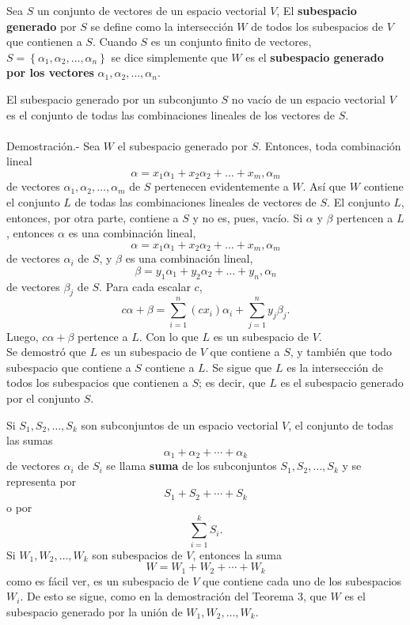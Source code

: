 \begin{def.}
    Sea $S$ un conjunto de vectores de un espacio vectorial $V$, El \textbf{subespacio generado} por $S$ se define como la intersección $W$ de todos los subespacios de $V$ que contienen a $S$. Cuando $S$ es un conjunto finito de vectores, $S=\left\{\alpha_1,\alpha_2,\ldots,\alpha_n\right\}$ se dice simplemente que $W$ es el \textbf{subespacio generado por los vectores} $\alpha_1,\alpha_2,\ldots,\alpha_n$.
\end{def.}

\begin{teo}
    El subespacio generado por un subconjunto $S$ no vacío de un espacio vectorial $V$ es el conjunto de todas las combinaciones lineales de los vectores de $S$.\\\\
	Demostración.-\; Sea $W$ el subespacio generado por $S$. Entonces, toda combinación lineal 
	$$\alpha=x_1\alpha_1+x_2\alpha_2+\ldots+x_m,\alpha_m$$
	de vectores $\alpha_1,\alpha_2,\ldots,\alpha_m$ de $S$ pertenecen evidentemente a $W$. Así que $W$ contiene el conjunto $L$ de todas las combinaciones lineales de vectores de $S$. El conjunto $L$, entonces, por otra parte, contiene a $S$ y no es, pues, vacío. Si $\alpha$ y $\beta$ pertencen a $L$, entonces $\alpha$ es una combinación lineal,
	$$\alpha=x_1\alpha_1+x_2\alpha_2+\ldots+x_m,\alpha_m$$
	de vectores $\alpha_i$ de $S$, y $\beta$ es una combinación lineal,
	$$\beta=y_1\alpha_1+y_2\alpha_2+\ldots+y_n,\alpha_n$$
	de vectores $\beta_j$ de $S$. Para cada escalar $c$,
	$$c\alpha+\beta=\sum_{i=1}^n (cx_i)\alpha_i+\sum_{j=1}^n y_j\beta_j.$$
	Luego, $c\alpha+\beta$ pertence a $L$. Con lo que $L$ es un subespacio de $V$.\\
	Se demostró que $L$ es un subespacio de $V$ que contiene a $S$, y también que todo subespacio que contiene a $S$ contiene a $L$. Se sigue que $L$ es la intersección de todos los subespacios que contienen a $S$; es decir, que $L$ es el subespacio generado por el conjunto $S$.
\end{teo}

\begin{def.}
    Si $S_1,S_2,\ldots,S_k$ son subconjuntos de un espacio vectorial $V$, el conjunto de todas las sumas 
    $$\alpha_1+\alpha_2+\cdots + \alpha_k$$
    de vectores $\alpha_i$ de $S_i$ se llama \textbf{suma} de los subconjuntos $S_1,S_2,\ldots , S_k$ y se representa por
    $$S_1+S_2+\cdots + S_k$$
    o por
    $$\sum_{i=1}^k S_i.$$
    Si $W_1,W_2,\ldots,W_k$ son subespacios de $V$, entonces la suma
    $$W=W_1+W_2+\cdots + W_k$$
    como es fácil ver, es un subespacio de $V$ que contiene cada uno de los subespacios $W_i$. De esto se sigue, como en la demostración del Teorema 3, que $W$ es el subespacio generado por la unión de $W_1,W_2,\ldots , W_k$.
\end{def.}


